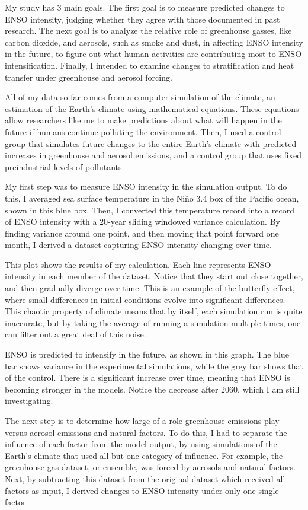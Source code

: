 \documentclass{basic}
\begin{document}
My study has 3 main goals. The first goal is to measure predicted changes to ENSO intensity, judging whether they agree with those documented in past research. The next goal is to analyze the relative role of greenhouse gasses, like carbon dioxide, and aerosols, such as smoke and dust, in affecting ENSO intensity in the future, to figure out what human activities are contributing most to ENSO intensification. Finally, I intended to examine changes to stratification and heat transfer under greenhouse and aerosol forcing.

All of my data so far comes from a computer simulation of the climate, an estimation of the Earth's climate using mathematical equations. These equations allow researchers like me to make predictions about what will happen in the future if humans continue polluting the environment. Then, I used a control group that simulates future changes to the entire Earth's climate with predicted increases in greenhouse and aerosol emissions, and a control group that uses fixed preindustrial levels of pollutants.

My first step was to measure ENSO intensity in the simulation output. To do this, I averaged sea surface temperature in the Niño 3.4 box of the Pacific ocean, shown in this blue box. Then, I converted this temperature record into a record of ENSO intensity with a 20-year sliding windowed variance calculation. By finding variance around one point, and then moving that point forward one month, I derived a dataset capturing ENSO intensity changing over time.

This plot shows the results of my calculation. Each line represents ENSO intensity in each member of the dataset. Notice that they start out close together, and then gradually diverge over time. This is an example of the butterfly effect, where small differences in initial conditions evolve into significant differences. This chaotic property of climate means that by itself, each simulation run is quite inaccurate, but by taking the average of running a simulation multiple times, one can filter out a great deal of this noise.

ENSO is predicted to intensify in the future, as shown in this graph. The blue bar shows variance in the experimental simulations, while the grey bar shows that of the control. There is a significant increase over time, meaning that ENSO is becoming stronger in the models. Notice the decrease after 2060, which I am still investigating.

The next step is to determine how large of a role greenhouse emissions play versus aerosol emissions and natural factors. To do this, I had to separate the influence of each factor from the model output, by using simulations of the Earth's climate that used all but one category of influence. For example, the greenhouse gas dataset, or ensemble, was forced by aerosols and natural factors. Next, by subtracting this dataset from the original dataset which received all factors as input, I derived changes to ENSO intensity under only one single factor.
\end{document}
